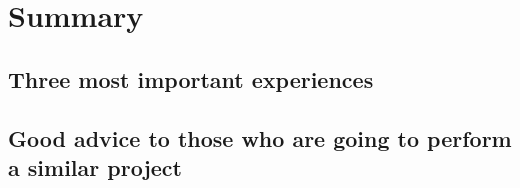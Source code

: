 \section{Summary}
\subsection{Three most important experiences}
\subsection{Good advice to those who are going to perform a similar project}